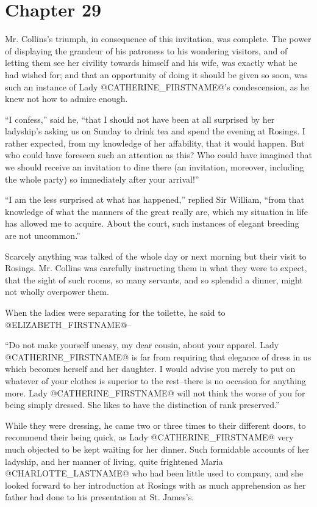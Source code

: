 \chapter*{Chapter 29}


Mr. Collins's triumph, in consequence of this invitation, was complete.
The power of displaying the grandeur of his patroness to his wondering
visitors, and of letting them see her civility towards himself and his
wife, was exactly what he had wished for; and that an opportunity
of doing it should be given so soon, was such an instance of Lady
@CATHERINE_FIRSTNAME@'s condescension, as he knew not how to admire enough.

``I confess,'' said he, ``that I should not have been at all surprised by
her ladyship's asking us on Sunday to drink tea and spend the evening at
Rosings. I rather expected, from my knowledge of her affability, that it
would happen. But who could have foreseen such an attention as this? Who
could have imagined that we should receive an invitation to dine there
(an invitation, moreover, including the whole party) so immediately
after your arrival!''

``I am the less surprised at what has happened,'' replied Sir William,
``from that knowledge of what the manners of the great really are, which
my situation in life has allowed me to acquire. About the court, such
instances of elegant breeding are not uncommon.''

Scarcely anything was talked of the whole day or next morning but their
visit to Rosings. Mr. Collins was carefully instructing them in what
they were to expect, that the sight of such rooms, so many servants, and
so splendid a dinner, might not wholly overpower them.

When the ladies were separating for the toilette, he said to @ELIZABETH_FIRSTNAME@--

``Do not make yourself uneasy, my dear cousin, about your apparel. Lady
@CATHERINE_FIRSTNAME@ is far from requiring that elegance of dress in us which
becomes herself and her daughter. I would advise you merely to put on
whatever of your clothes is superior to the rest--there is no occasion
for anything more. Lady @CATHERINE_FIRSTNAME@ will not think the worse of you
for being simply dressed. She likes to have the distinction of rank
preserved.''

While they were dressing, he came two or three times to their different
doors, to recommend their being quick, as Lady @CATHERINE_FIRSTNAME@ very much
objected to be kept waiting for her dinner. Such formidable accounts of
her ladyship, and her manner of living, quite frightened Maria @CHARLOTTE_LASTNAME@
who had been little used to company, and she looked forward to her
introduction at Rosings with as much apprehension as her father had done
to his presentation at St. James's.

